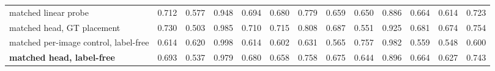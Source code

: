 \begin{tabular}{lcccccccccccc}
matched linear probe & 0.712 & 0.577 & 0.948 & 0.694 & 0.680 & 0.779 & 0.659 & 0.650 & 0.886 & 0.664 & 0.614 & 0.723 \\
matched head, GT placement & 0.730 & 0.503 & 0.985 & 0.710 & 0.715 & 0.808 & 0.687 & 0.551 & 0.925 & 0.681 & 0.674 & 0.754 \\
matched per-image control, label-free & 0.614 & 0.620 & 0.998 & 0.614 & 0.602 & 0.631 & 0.565 & 0.757 & 0.982 & 0.559 & 0.548 & 0.600 \\
\textbf{matched head, label-free} & 0.693 & 0.537 & 0.979 & 0.680 & 0.658 & 0.758 & 0.675 & 0.644 & 0.896 & 0.664 & 0.627 & 0.743 \\
\bottomrule
\end{tabular}
